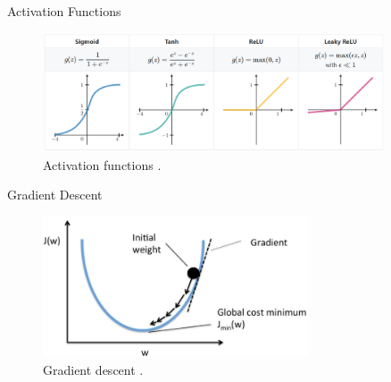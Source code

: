 \begin{frame}{Activation Functions}
    \begin{figure}[H]
		\centering
		\includegraphics[width=0.9\textwidth]{Figs/activation_function_2.png}
		\caption{Activation functions \cite{activation-functions}.}
	\end{figure}
\end{frame}

\begin{frame}{Gradient Descent}
    \begin{figure}[H]
		\centering
		\includegraphics[width=0.70\textwidth]{Figs/gradient_descent2.png}
		\caption{Gradient descent \cite{gradient-descend2}.}
	\end{figure}
\end{frame}

